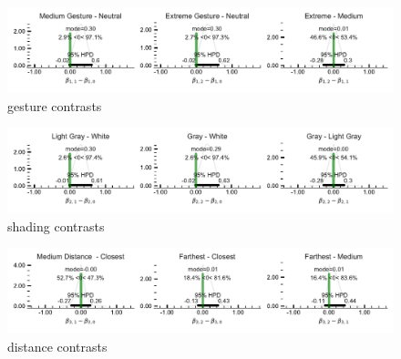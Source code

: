 \begin{figure}
 \includegraphics[width=\textwidth]{./hari-code/factors_gesture_contrasts_main-noint.pdf}
 \caption{gesture contrasts}
 \label{fig:gesture-contrasts-main}
\end{figure}

\begin{figure}
 \includegraphics[width=\textwidth]{./hari-code/factors_shading_contrasts_main-noint.pdf}
 \caption{shading contrasts}
 \label{fig:shading-contrasts-main}
\end{figure}

\begin{figure}
 \includegraphics[width=\textwidth]{./hari-code/factors_distance_contrasts_main-noint.pdf}
 \caption{distance contrasts}
 \label{fig:distance-contrasts-main}
\end{figure}
